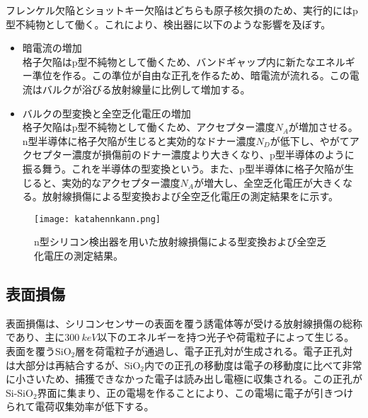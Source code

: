フレンケル欠陥とショットキー欠陥はどちらも原子核欠損のため、実行的にはp型不純物として働く。これにより、検出器に以下のような影響を及ぼす。
\begin{itemize}
  \item 暗電流の増加\\
  格子欠陥はp型不純物として働くため、バンドギャップ内に新たなエネルギー準位を作る。この準位が自由な正孔を作るため、暗電流が流れる。この電流はバルクが浴びる放射線量に比例して増加する。
  \item バルクの型変換と全空乏化電圧の増加\\
  格子欠陥はp型不純物として働くため、アクセプター濃度$N_A$が増加させる。n型半導体に格子欠陥が生じると実効的なドナー濃度$N_D$が低下し、やがてアクセプター濃度が損傷前のドナー濃度より大きくなり、p型半導体のように振る舞う。これを半導体の型変換という。また、p型半導体に格子欠陥が生じると、実効的なアクセプター濃度$N_A$が増大し、全空乏化電圧が大きくなる。放射線損傷による型変換および全空乏化電圧の測定結果をに示す。
\end{itemize}
\begin{figure}[tbp]
  \centering
  \texttt{[image: katahennkann.png]}
  \caption[放射線損傷による型変換および全空乏化電圧の測定結果]{n型シリコン検出器を用いた放射線損傷による型変換および全空乏化電圧の測定結果\cite{typeinversion}。}
  \label{fig:katahennkann}
\end{figure}



\subsection{表面損傷}
\label{sec:hyoumen}
表面損傷は、シリコンセンサーの表面を覆う誘電体等が受ける放射線損傷の総称であり、主に$300\ \si{keV}$以下のエネルギーを持つ光子や荷電粒子によって生じる。表面を覆うSiO$_2$層を荷電粒子が通過し、電子正孔対が生成される。電子正孔対は大部分は再結合するが、SiO$_2$内での正孔の移動度は電子の移動度に比べて非常に小さいため、捕獲できなかった電子は読み出し電極に収集される。この正孔がSi-SiO$_2$界面に集まり、正の電場を作ることにより、この電場に電子が引きつけられて電荷収集効率が低下する。



